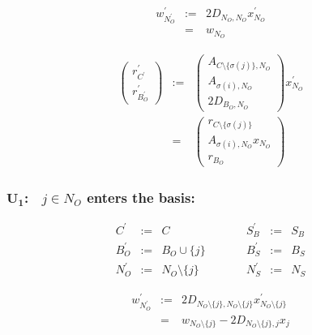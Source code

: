 \documentclass[a4paper]{article}
\begin{document}
\begin{eqnarray}
w_{N_{O}^{\prime}}^{\prime}
&:=&
2D_{N_{O}, N_{O}}x_{N_{O}}^{\prime}
\nonumber \\
&=&
w_{N_{O}}
\end{eqnarray}

\begin{eqnarray}
\left(
\begin{array}{c}
r_{C^{\prime}}^{\prime} \\
\hline
r_{B_{O}^{\prime}}^{\prime}
\end{array}
\right)
&:=&
\left(
\begin{array}{c}
A_{C \setminus \{\sigma(j)\}, N_{O}} \\
\hline
A_{\sigma(i), N_{O}} \\
\hline
2D_{B_{O}, N_{O}}
\end{array}
\right)
x_{N_{O}}^{\prime} 
\nonumber \\
&=&
\left(
\begin{array}{c}
r_{C \setminus \{\sigma(j)\}} \\
\hline
A_{\sigma(i), N_{O}}x_{N_{O}} \\
\hline
r_{B_{O}}
\end{array}
\right)
\end{eqnarray}

\subsubsection{$\mathbf{U_{1}}$:$\quad j \in N_{O}$ enters the basis:}
\begin{equation}
\label{update:original_enters_basis}
\begin{array}{ccccccc}
C^{\prime}      &:=&  C
&\quad\quad&
S_{B}^{\prime}  &:=&  S_{B}   \\
B_{O}^{\prime}  &:=&  B_{O} \cup \{j\}
&\quad\quad&
B_{S}^{\prime}  &:=&  B_{S}   \\
N_{O}^{\prime}  &:=&  N_{O} \setminus \{j\}
&\quad\quad&
N_{S}^{\prime}  &:=&  N_{S} 
\end{array}
\end{equation}

\begin{eqnarray}
w_{N_{O}^{\prime}}^{\prime}
&:=&
2D_{N_{O} \setminus \{j\}, N_{O} \setminus \{j\}}
x_{N_{O} \setminus \{j\}}^{\prime}
\nonumber \\
&=&
w_{N_{O} \setminus \{j\}} - 2D_{N_{O} \setminus \{j\}, j}x_{j}
\end{eqnarray}
\end{document}
